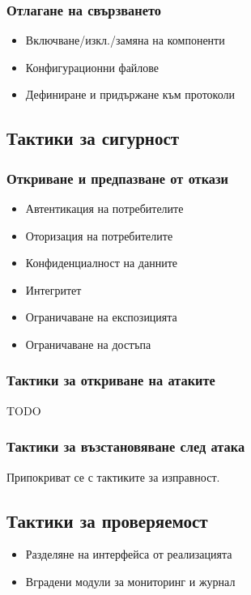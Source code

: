 \documentclass[fleqn,12pt]{article}
\begin{document}
\subsubsection{Отлагане на свързването}
\begin{itemize}
\item Включване/изкл./замяна на компоненти
\item Конфигурационни файлове
\item Дефиниране и придържане към протоколи
\end{itemize}


\subsection{Тактики за сигурност}
\subsubsection{Откриване и предпазване от откази}
\begin{itemize}
\item Автентикация на потребителите
\item Оторизация на потребителите
\item Конфиденциалност на данните
\item Интегритет
\item Ограничаване на експозицията
\item Ограничаване на достъпа
\end{itemize}
\subsubsection{Тактики за откриване на атаките}
TODO
\subsubsection{Тактики за възстановяване след атака}
Припокриват се с тактиките за изправност.

\subsection{Тактики за проверяемост}
\begin{itemize}
\item Разделяне на интерфейса от реализацията
\item Вградени модули за мониторинг и журнал
\end{itemize}
\end{document}

